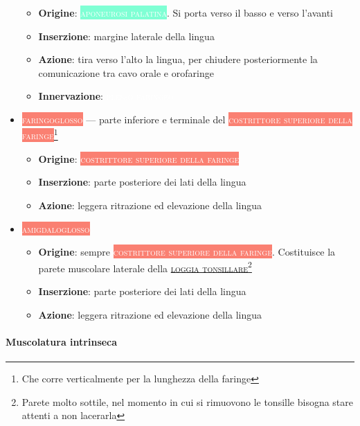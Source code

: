 \documentclass[italian,]{article}
\providecommand{\tightlist}{%
  \setlength{\itemsep}{0pt}\setlength{\parskip}{0pt}}
\newcommand{\mus}[1]{\colorbox{Salmon}{\textcolor{white}{\textsc{#1}}}}
\newcommand{\tol}[1]{\colorbox{Aquamarine}{\textcolor{white}{\textsc{#1}}}}
\newcommand{\ner}[1]{\colorbox{Dandelion}{\textcolor{white}{\textsc{#1}}}}
\renewcommand{\a}[1]{\underline{\textsc{#1}}}
\begin{document}
\begin{itemize}
  \begin{itemize}
  \tightlist
  \item
    \textbf{Origine}: \tol{aponeurosi palatina}. Si porta verso il basso
    e verso l'avanti
  \item
    \textbf{Inserzione}: margine laterale della lingua
  \item
    \textbf{Azione}: tira verso l'alto la lingua, per chiudere
    posteriormente la comunicazione tra cavo orale e orofaringe
  \item
    \textbf{Innervazione}: \ner{plesso faringeo}
  \end{itemize}
\item
  \mus{faringoglosso} --- parte inferiore e terminale del
  \mus{costrittore superiore della faringe}\footnote{Che corre
    verticalmente per la lunghezza della faringe}

  \begin{itemize}
  \tightlist
  \item
    \textbf{Origine}: \mus{costrittore superiore della faringe}
  \item
    \textbf{Inserzione}: parte posteriore dei lati della lingua
  \item
    \textbf{Azione}: leggera ritrazione ed elevazione della lingua
  \end{itemize}
\item
  \mus{amigdaloglosso}~

  \begin{itemize}
  \tightlist
  \item
    \textbf{Origine}: sempre \mus{costrittore superiore della faringe}.
    Costituisce la parete muscolare laterale della
    \a{loggia tonsillare}\footnote{Parete molto sottile, nel momento in
      cui si rimuovono le tonsille bisogna stare attenti a non lacerarla}
  \item
    \textbf{Inserzione}: parte posteriore dei lati della lingua
  \item
    \textbf{Azione}: leggera ritrazione ed elevazione della lingua
  \end{itemize}
\end{itemize}

\hypertarget{muscolatura-intrinseca}{%
\paragraph{Muscolatura intrinseca}\label{muscolatura-intrinseca}}
\end{document}
